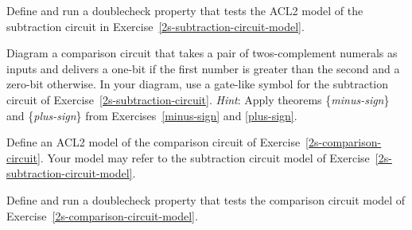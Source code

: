 \begin{ExerciseList}
\Exercise Define and run a doublecheck property that
tests the ACL2 model of the subtraction circuit
in Exercise~\ref{2s-subtraction-circuit-model}.

\Exercise \label{2s-comparison-circuit}
Diagram a comparison circuit that takes a pair of
twos-complement numerals as inputs and delivers a one-bit
if the first number is greater than the second
and a zero-bit otherwise.
In your diagram, use a gate-like symbol
for the subtraction circuit of Exercise~\ref{2s-subtraction-circuit}.
\emph{Hint}: Apply theorems \{\emph{minus-sign}\} and \{\emph{plus-sign}\}
from Exercises~\ref{minus-sign} and \ref{plus-sign}.

\Exercise \label{2s-comparison-circuit-model}
Define an ACL2 model of the comparison circuit
of Exercise~\ref{2s-comparison-circuit}.
Your model may refer to the subtraction circuit model
of Exercise~\ref{2s-subtraction-circuit-model}.

\Exercise Define and run a doublecheck property
that tests the comparison circuit model
of Exercise~\ref{2s-comparison-circuit-model}.

\end{ExerciseList}

